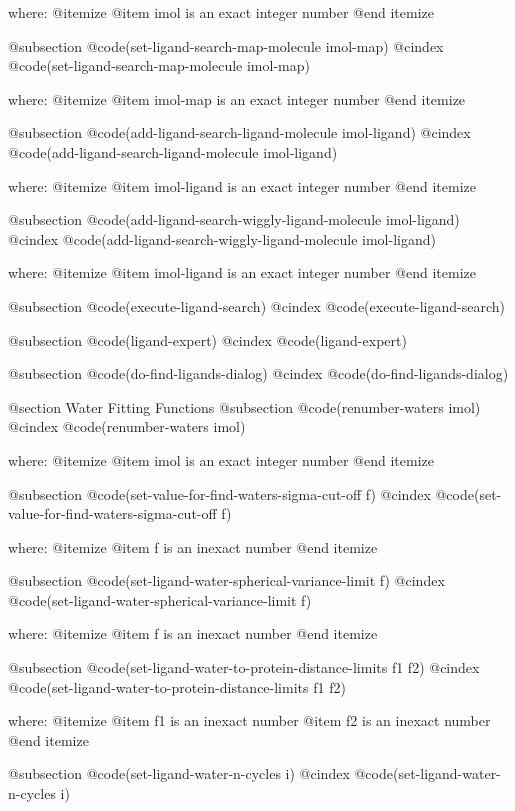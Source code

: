 where: 
 @itemize 
     @item imol is an exact integer number
 @end itemize


@subsection @code{(set-ligand-search-map-molecule imol-map)}
@cindex @code{(set-ligand-search-map-molecule imol-map)}
 
where: 
 @itemize 
     @item imol-map is an exact integer number
 @end itemize


@subsection @code{(add-ligand-search-ligand-molecule imol-ligand)}
@cindex @code{(add-ligand-search-ligand-molecule imol-ligand)}
 
where: 
 @itemize 
     @item imol-ligand is an exact integer number
 @end itemize


@subsection @code{(add-ligand-search-wiggly-ligand-molecule imol-ligand)}
@cindex @code{(add-ligand-search-wiggly-ligand-molecule imol-ligand)}
 
where: 
 @itemize 
     @item imol-ligand is an exact integer number
 @end itemize


@subsection @code{(execute-ligand-search)}
@cindex @code{(execute-ligand-search)}
 
@subsection @code{(ligand-expert)}
@cindex @code{(ligand-expert)}
 
@subsection @code{(do-find-ligands-dialog)}
@cindex @code{(do-find-ligands-dialog)}
 

@section Water Fitting Functions 
@subsection @code{(renumber-waters imol)}
@cindex @code{(renumber-waters imol)}
 
where: 
 @itemize 
     @item imol is an exact integer number
 @end itemize


@subsection @code{(set-value-for-find-waters-sigma-cut-off f)}
@cindex @code{(set-value-for-find-waters-sigma-cut-off f)}
 
where: 
 @itemize 
     @item f is an inexact number
 @end itemize


@subsection @code{(set-ligand-water-spherical-variance-limit f)}
@cindex @code{(set-ligand-water-spherical-variance-limit f)}
 
where: 
 @itemize 
     @item f is an inexact number
 @end itemize


@subsection @code{(set-ligand-water-to-protein-distance-limits f1 f2)}
@cindex @code{(set-ligand-water-to-protein-distance-limits f1 f2)}
 
where: 
 @itemize 
     @item f1 is an inexact number
     @item f2 is an inexact number
 @end itemize


@subsection @code{(set-ligand-water-n-cycles i)}
@cindex @code{(set-ligand-water-n-cycles i)}
 
